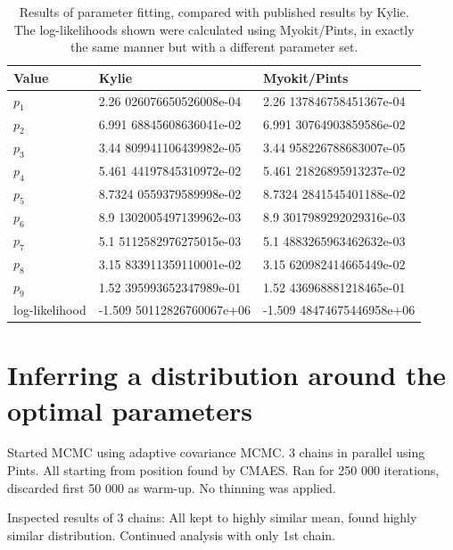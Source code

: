 \documentclass[preprint,authoryear,10pt]{elsarticle}
\newcommand{\startrowcolors}{\rowcolors{2}{gray!15}{white}}
\newcommand*{\thead}[1]{\bfseries #1}
\begin{document}
\begin{table}[H]
\centering
\caption{%
Results of parameter fitting, compared with published results by Kylie.
The log-likelihoods shown were calculated using Myokit/Pints, in exactly the
same manner but with a different parameter set.
}
\label{tab:sine-wave-loglikelihood2}
\startrowcolors
\footnotesize
\begin{tabular}{lll}
\hline
\thead{Value} & \thead{Kylie} & \thead{Myokit/Pints} \\
\hline
$p_1$ & 2.26 026076650526008e-04 & 2.26 137846758451367e-04 \\
$p_2$ & 6.991 68845608636041e-02 & 6.991 30764903859586e-02 \\
$p_3$ & 3.44 809941106439982e-05 & 3.44 958226788683007e-05 \\
$p_4$ & 5.461 44197845310972e-02 & 5.461 21826895913237e-02 \\
$p_5$ & 8.7324 0559379589998e-02 & 8.7324 2841545401188e-02 \\
$p_6$ & 8.9 1302005497139962e-03 & 8.9 3017989292029316e-03 \\
$p_7$ & 5.1 5112582976275015e-03 & 5.1 4883265963462632e-03 \\
$p_8$ & 3.15 833911359110001e-02 & 3.15 620982414665449e-02 \\
$p_9$ & 1.52 395993652347989e-01 & 1.52 436968881218465e-01 \\
log-likelihood & -1.509 50112826760067e+06 & -1.509 48474675446958e+06 \\
\hline
\end{tabular}
\end{table}







%
%
%
%
\section{Inferring a distribution around the optimal parameters}

Started MCMC using adaptive covariance MCMC.
3 chains in parallel using Pints.
All starting from position found by CMAES.
Ran for 250 000 iterations, discarded first 50 000 as warm-up.
No thinning was applied.

Inspected results of 3 chains: All kept to highly similar mean, found highly
 similar distribution.
Continued analysis with only 1st chain.
\end{document}
